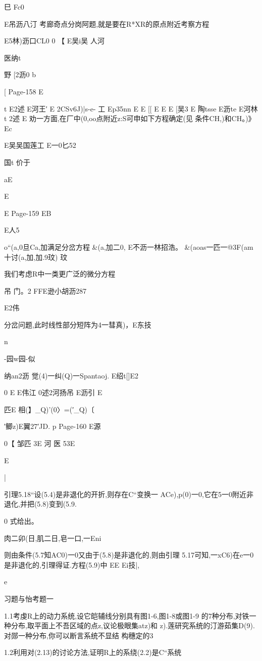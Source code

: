 {{{{{{{{{{{{{{{{{巳
Fc0

E吊沥八汀
考廊奇点分岗阿题,就是要在R*XR的原点附近考察方程

E5林)沥口CL0
0
【
E吴i吴
人河

医纳t

野
[2沥0
b

[
Page-158
E

t
E2述
E河王′
E
2CSv6J)|s-e-
工
Ep35nn
E
E
[[
E
E
E
[吴3
E
陶tsse
E沥te
E河林t
2述
E
劝一方面,在厂中(0,oo点附近z:S可申如下方程确定(见
条件CH,)和CH。)》
Ec

E吴吴国莲工
E一0匕52

国t
价于

aE

E

E
Page-159
EB

E人5

o“(a,0旦Ca,加满足分岔方程
&(a,加二0,
E不沥一林招浩。
&(aoas一匹一@3F(am十讨(a,加,加.9玟)
玟

我们考虑R中一类更广泛的微分方程

吊
门。2
FFE逊小胡沥287

E2伟

分岔问题,此时线性部分短阵为4一彗真)，E东技

n

-园w园-似

纳an2沥
觉(4)一纠(Q)一Spantaoj.
E绍t[]E2

0
E
E伟江
0述2河扬吊
E沥引
E

匹E
相(】_Q)'(0〉=(′_Q)〔

′鲫z)E翼27′JD.
p
Page-160
E源

0【
邹匹
3E
河
医
53E

E

|

引理5.18“设(5.4)是非退化的开折,则存在C“变换一
ACe),p(0)一0,它在5一0附近非退化,并把(5.8)变到(5.9.

0
式给出。

肉二卯(日,肌二日,皂一口,一Eni

则由条件(5.7知AC0)一0又由于(5.8)是非退化的,则由引理
5.17可知,一xC6)在e一0是非退化的,引理得证.方程(5.9)中
EE
Ei技|,

e

习题与怡考题一

1.1考虔R上的动力系统,设它皑辅线分别具有图1-6,图1-8或图1-9
的7种分布,对铁一种分布,取平面上不吾区域的点z,议论极眼集atz)和
z).莲研究系统的汀游茹集D(9).对郧一种分布,你可以断言系统不显结
构穗定的3

1.2利用对(2.13)的讨论方法,证明R上的系绕(2.2)是C“系统

}}}}}}}}}}}}}}}}}
